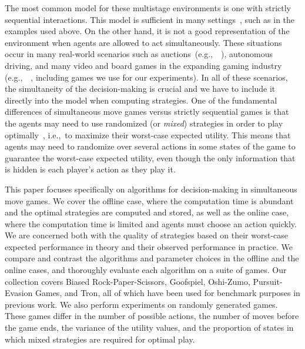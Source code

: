 \documentclass[preprint,12pt]{elsarticle}
\newcommand{\eg}{{e.g.,}~}
\newcommand{\ie}{{i.e.,}~}
\newcommand{\reviewchange}[1]{{\color{black}#1}}
\newcommand{\reviewchangeT}[1]{{\color{blue}#1}}
\begin{document}
The most common model for these multistage environments is one with strictly sequential
interactions. 
This model is sufficient in many
settings~\cite{AIbook}, such as in the examples used above.
\reviewchange{On the other hand, it is not a good representation of the environment when agents are allowed to act simultaneously.
These situations occur in many real-world scenarios such as auctions~(\eg~\cite{Keuter1997}), autonomous driving, and many video
and board games in the expanding gaming industry (\eg~\cite{Beard12Using,Teytaud11Upper}, including games we use for our experiments).
In all of these scenarios, the simultaneity of the decision-making is crucial and we have to include it directly into the model when computing strategies.}
One of the fundamental differences of simultaneous move games versus strictly sequential
games is that the agents may need to use randomized (or \textit{mixed}) strategies in order to
play optimally~\cite{Gintis09},
\ie to maximize their worst-case expected utility.
\reviewchangeT{This means that agents may need to randomize over several actions in some states of the game
to guarantee the worst-case expected utility, even though the only information that is hidden is each player's
action as they play it.} %

\reviewchange{This paper focuses specifically on algorithms for decision-making in simultaneous move games.} 
We cover the offline case, where the computation time is abundant and the optimal strategies are computed and stored, 
as well as the online case, where the computation time is limited and agents must choose an action quickly.
We are concerned both with the quality of strategies based on
their worst-case expected performance in theory and their observed performance in practice. 
We compare and contrast the algorithms and parameter choices in the offline and the online cases, and thoroughly evaluate each
algorithm on a suite of games. Our collection covers Biased Rock-Paper-Scissors, Goofspiel, Oshi-Zumo,
Pursuit-Evasion Games, and Tron, all of which have been used for benchmark purposes
in previous work. We also perform experiments on randomly generated games. These games differ
in the number of possible actions, the number of moves before the game ends, the variance of the utility values,
and the proportion of states in which mixed strategies are required for optimal play. %
\end{document}
